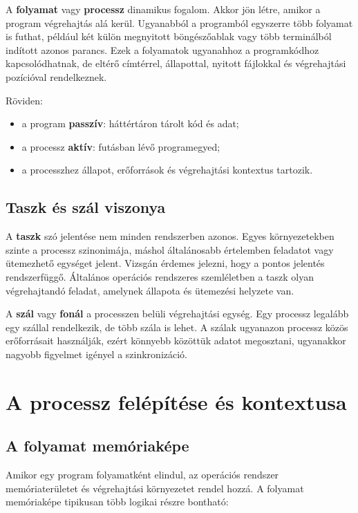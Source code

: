 A \textbf{folyamat} vagy \textbf{processz} dinamikus fogalom. Akkor jön létre, amikor a program végrehajtás alá kerül. Ugyanabból a programból egyszerre több folyamat is futhat, például két külön megnyitott böngészőablak vagy több terminálból indított azonos parancs. Ezek a folyamatok ugyanahhoz a programkódhoz kapcsolódhatnak, de eltérő címtérrel, állapottal, nyitott fájlokkal és végrehajtási pozícióval rendelkeznek.

Röviden:

\begin{itemize}
  \item a program \textbf{passzív}: háttértáron tárolt kód és adat;
  \item a processz \textbf{aktív}: futásban lévő programegyed;
  \item a processzhez állapot, erőforrások és végrehajtási kontextus tartozik.
\end{itemize}

\subsection{Taszk és szál viszonya}

A \textbf{taszk} szó jelentése nem minden rendszerben azonos. Egyes környezetekben szinte a processz szinonimája, máshol általánosabb értelemben feladatot vagy ütemezhető egységet jelent. Vizsgán érdemes jelezni, hogy a pontos jelentés rendszerfüggő. Általános operációs rendszeres szemléletben a taszk olyan végrehajtandó feladat, amelynek állapota és ütemezési helyzete van.

A \textbf{szál} vagy \textbf{fonál} a processzen belüli végrehajtási egység. Egy processz legalább egy szállal rendelkezik, de több szála is lehet. A szálak ugyanazon processz közös erőforrásait használják, ezért könnyebb közöttük adatot megosztani, ugyanakkor nagyobb figyelmet igényel a szinkronizáció.

\section{A processz felépítése és kontextusa}

\subsection{A folyamat memóriaképe}

Amikor egy program folyamatként elindul, az operációs rendszer memóriaterületet és végrehajtási környezetet rendel hozzá. A folyamat memóriaképe tipikusan több logikai részre bontható:

